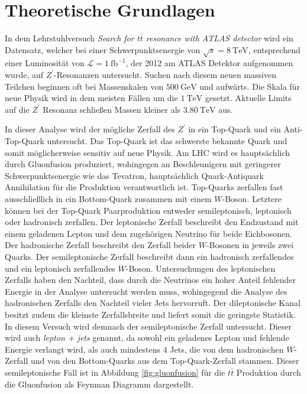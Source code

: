 \section{Theoretische Grundlagen}
\label{sec:theorie}

In dem Lehrstuhlversuch \textit{Search for $t\bar{t}$ resonance with ATLAS detector} wird ein Datensatz, welcher bei
einer Schwerpunktsenergie von $\sqrt{s} = \SI{8}{\tera\electronvolt}$, entsprechend einer Luminosität von
$\mathcal{L} = \SI{1}{\femto\barn}^{-1}$, der 2012 am ATLAS Detektor \cite{ATLAS_DETECTOR} aufgenommen wurde, auf $Z^\prime$-Resonanzen untersucht.
Suchen nach diesem neuen massiven Teilchen beginnen oft bei Massenskalen von $\SI{500}{\giga\electronvolt}$ und aufwärts. Die
Skala für neue Physik wird in dem meisten Fällen um die $\SI{1}{\tera\electronvolt}$ gesetzt. Aktuelle Limits auf die
$Z^\prime$ Resonanz schließen Massen kleiner als $\SI{3.80}{\tera\electronvolt}$ \cite{CMSlimit} aus. \par

In dieser Analyse wird der mögliche Zerfall des $Z^\prime$ in ein Top-Quark und ein Anti-Top-Quark untersucht. Das Top-Quark
ist das schwerste bekannte Quark und somit möglicherweise sensitiv auf neue Physik. Am LHC wird es hauptsächlich durch Gluonfusion
produziert, wohingegen an Beschleunigern mit geringerer Schwerpunktsenergie wie das Tevatron, hauptsächlich Quark-Antiquark
Annihilation für die Produktion verantwortlich ist. Top-Quarks
zerfallen fast ausschließlich in ein Bottom-Quark zusammen mit einem $W$-Boson. Letztere können bei der
Top-Quark Paarproduktion entweder semileptonisch,
leptonisch oder hadronisch zerfallen. Der leptonische Zerfall beschreibt den Endzustand mit einem geladenen Lepton und
dem zugehörigen Neutrino für beide Eichbosonen. Der hadronische Zerfall beschreibt den Zerfall beider $W$-Bosonen in
jeweils zwei Quarks. Der semileptonische Zerfall beschreibt dann ein hadronisch zerfallendes und ein leptonisch
zerfallendes  $W$-Boson. Untersuchungen des leptonischen Zerfalls haben den Nachteil, dass durch die Neutrinos ein hoher Anteil fehlender
Energie in der Analyse untersucht werden muss, wohingegend die Analyse des hadronischen Zerfalls den Nachteil vieler Jets
hervorruft. Der dileptonische Kanal besitzt zudem die kleinste Zerfallsbreite und liefert somit die geringste Statistik. 
In diesem Versuch wird demnach der semileptonische Zerfall untersucht.
Dieser wird auch \textit{lepton + jets} genannt,
da sowohl ein geladenes Lepton und fehlende Energie verlangt wird, als auch mindestens 4 Jets, die von dem hadronischen $W$-Zerfall und von den Bottom-Quarks
aus dem Top-Quark-Zerfall stammen.
Dieser semileptonische Fall ist in Abbildung \ref{fig:gluonfusion} für die $t\bar{t}$ Produktion durch die Gluonfusion als Feynman Diagramm dargestellt.  \par


